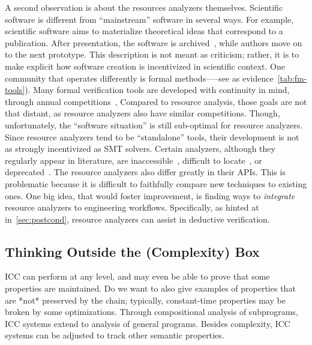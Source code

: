 A second observation is about the resources analyzers themselves.
Scientific software is different from \enquote{mainstream} software in several ways.
For example, scientific software aims to materialize theoretical ideas that correspond to a publication.
After presentation, the software is archived~\cite{acm_badging}, while authors move on to the next prototype.
This description is not meant as criticism;
rather, it is to make explicit how software creation is incentivized in scientific context.
One community that operates differently is formal methods—--see as evidence~\autoref{tab:fm-tools}).
Many formal verification tools are developed with continuity in mind, through annual competitions~\cite{casc,beyer2022}, \etc
Compared to resource analysis, those goals are not that distant, as resource analyzers also have similar competitions.
Though, unfortunately, the \enquote{software situation} is still sub-optimal for resource analyzers.
Since resource analyzers tend to be \enquote{standalone} tools, their development is not as strongly incentivized as \eg SMT solvers.
Certain analyzers, although they regularly appear in literature, are inaccessible~\cite{sinn2017}, difficult to locate~\cite{carbonneaux2015},
or deprecated~\cite{gulwani2009,srikanth2017}.
The resource analyzers also differ greatly in their APIs.
This is problematic because it is difficult to faithfully compare new techniques to existing ones.
One big idea, that would foster improvement, is finding ways to \emph{integrate} resource analyzers to engineering workflows.
Specifically, as hinted at in~\autoref{sec:postcond}, resource analyzers can assist in deductive verification.

\subsection{Thinking Outside the (Complexity) Box}
\label{subsec:res-other-props}

ICC can perform at any level, and may even be able to prove that some properties are maintained.
Do we want to also give examples of properties that are *not* preserved by the chain;
typically, constant-time properties may be broken by some optimizations.
Through compositional analysis of subprograms, ICC systems extend to analysis of general programs.
Besides complexity, ICC systems can be adjusted to track other semantic properties.

